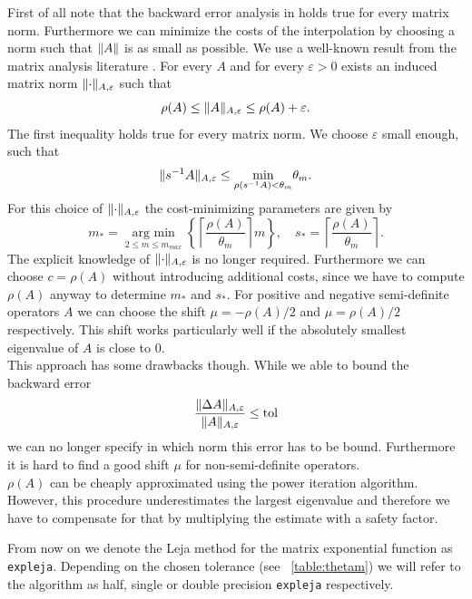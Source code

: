 \documentclass{scrartcl}
\begin{document}
First of all note that the backward error analysis in \cite{lejarev} holds true for every matrix norm. Furthermore we can minimize the costs of the interpolation by choosing a norm such that $\lVert A\rVert$ is as small as possible.
We use a well-known result from the matrix analysis literature \cite[Lemma 5.6.10.]{matrixanalysis}. For every $A$ and for every $\varepsilon>0$ exists an induced matrix norm $\lVert\cdot\rVert_{A,\varepsilon}$ such that
\[
	\rho(A) \le \lVert A\rVert_{A,\varepsilon} \le \rho(A) + \varepsilon. 
\]
The first inequality holds true for every matrix norm. We choose $\varepsilon$ small enough, such that
\[
	\lVert s^{-1}A\rVert_{A,\varepsilon} \le \underset{\rho(s^{-1}A) < \theta_m}{\min}\theta_m.
\]
For this choice of $\lVert\cdot\rVert_{A,\varepsilon}$ the cost-minimizing parameters are given by
\[
	m_* = \underset{2\le m\le m_{max}}{\operatorname{arg\ min}}  \left\{{\left\lceil{\frac{\rho(A)}{\theta_m}}\right\rceil}m\right\}, \quad
	s_* =  \left\lceil{\frac{\rho(A)}{\theta_m}}\right\rceil.
\]
The explicit knowledge of $\lVert\cdot\rVert_{A,\varepsilon}$ is no longer required. Furthermore we can choose $c=\rho(A)$ without introducing additional costs, since we have to compute $\rho(A)$ anyway to determine $m_*$ and $s_*$. 
For positive and negative semi-definite operators $A$ we can choose the shift $\mu = -\rho(A)/2$ and $\mu = \rho(A)/2$ respectively. This shift works particularly well if the absolutely smallest eigenvalue of $A$ is close to $0$.\\
This approach has some drawbacks though. While we able to bound the backward error
\[
	\frac{\lVert\Delta A\rVert_{A,\varepsilon}}{\lVert A\rVert_{A,\varepsilon}} \le \operatorname{tol}  
\]
we can no longer specify in which norm this error has to be bound. Furthermore it is hard to find a good shift $\mu$ for non-semi-definite operators.\\
$\rho(A)$ can be cheaply approximated using the power iteration algorithm. However, this procedure underestimates the largest eigenvalue and therefore we have to compensate for that by multiplying the estimate with a safety factor. 



From now on we denote the Leja method for the matrix exponential function as \texttt{expleja}. Depending on the chosen tolerance (see ~\ref{table:thetam}) we will refer to the algorithm as half, single or double precision \texttt{expleja} respectively.
\end{document}
